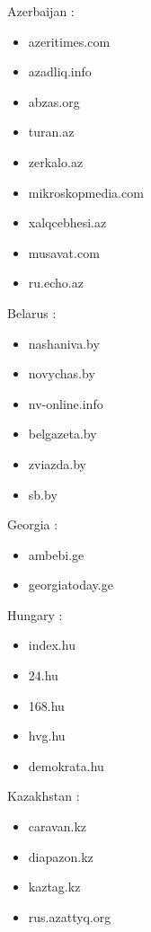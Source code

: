 \documentclass[
  letterpaper,
  DIV=11,
  numbers=noendperiod]{scrartcl}
\providecommand{\tightlist}{%
  \setlength{\itemsep}{0pt}\setlength{\parskip}{0pt}}\usepackage{longtable,booktabs,array}
\begin{document}
Azerbaijan :

\begin{itemize}
\tightlist
\item
  azeritimes.com
\item
  azadliq.info
\item
  abzas.org
\item
  turan.az
\item
  zerkalo.az
\item
  mikroskopmedia.com
\item
  xalqcebhesi.az
\item
  musavat.com
\item
  ru.echo.az
\end{itemize}

Belarus :

\begin{itemize}
\tightlist
\item
  nashaniva.by
\item
  novychas.by
\item
  nv-online.info
\item
  belgazeta.by
\item
  zviazda.by
\item
  sb.by
\end{itemize}

Georgia :

\begin{itemize}
\tightlist
\item
  ambebi.ge
\item
  georgiatoday.ge
\end{itemize}

Hungary :

\begin{itemize}
\tightlist
\item
  index.hu
\item
  24.hu
\item
  168.hu
\item
  hvg.hu
\item
  demokrata.hu
\end{itemize}

Kazakhstan :

\begin{itemize}
\tightlist
\item
  caravan.kz
\item
  diapazon.kz
\item
  kaztag.kz
\item
  rus.azattyq.org
\end{itemize}
\end{document}
